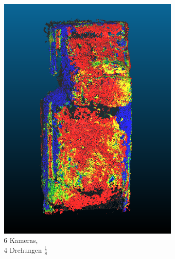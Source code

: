\documentclass[./00PhotoBox.tex]{subfiles}
\begin{document}
\begin{figure}
\begin{subfigure}{0.24\textwidth}
        \includegraphics[width=1\linewidth]{img/cam_anzahl/justOneRow4Turns.png}
        \centering
        \caption{6 Kameras,\\4 Drehungen $\frac{1}{8}$\\} %
        \label{img:moai_eineEbene} %
    \end{subfigure}
    \begin{subfigure}{0.24\textwidth}

\end{subfigure}
\end{figure}
\end{document}
